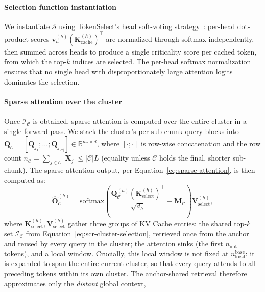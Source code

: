 \documentclass[10pt,conference]{IEEEtran}
\begin{document}
\paragraph{Selection function instantiation} 
We instantiate $\mathcal{S}$ using TokenSelect's head soft-voting 
strategy~\cite{tokenselect2025}: per-head dot-product scores
$\mathbf{v}_a^{(h)} (\mathbf{K}^{(h)}_{\text{cache}})^\top$
are normalized through softmax independently, then summed across 
heads to produce a single criticality score per cached token, from 
which the top-$k$ indices are selected. The per-head softmax 
normalization ensures that no single head with disproportionately 
large attention logits dominates the selection.

\paragraph{Sparse attention over the cluster} 
Once $\mathcal{I}_{\mathcal{C}}$ is obtained, sparse attention is 
computed over the entire cluster in a single forward pass. We stack the
cluster's per-sub-chunk query blocks into
$\mathbf{Q}_{\mathcal{C}} = [\mathbf{Q}_{j_1}; \ldots; \mathbf{Q}_{j_{|\mathcal{C}|}}] \in \mathbb{R}^{n_{\mathcal{C}} \times d}$,
where $[\cdot;\cdot]$ is row-wise concatenation and the row count
$n_{\mathcal{C}} = \sum_{j \in \mathcal{C}} |\mathbf{X}_j| \leq |\mathcal{C}| L$
(equality unless $\mathcal{C}$ holds the final, shorter sub-chunk).
The sparse attention output, per
Equation~\eqref{eq:sparse-attention}, is then computed as:
\begin{equation}
    \hat{\mathbf{O}}_{\mathcal{C}}^{(h)} = \text{softmax}\!\left(\frac{\mathbf{Q}_{\mathcal{C}}^{(h)} (\mathbf{K}^{(h)}_{\text{select}})^\top}{\sqrt{d_h}} + \mathbf{M}_{\mathcal{C}}\right) \mathbf{V}^{(h)}_{\text{select}},
    \label{eq:scr-cluster-attention}
\end{equation}
where $\mathbf{K}^{(h)}_{\text{select}}, \mathbf{V}^{(h)}_{\text{select}}$
gather three groups of KV Cache entries: the shared top-$k$ set
$\mathcal{I}_{\mathcal{C}}$ from Equation~\eqref{eq:scr-cluster-selection},
retrieved once from the anchor and reused by every query in the cluster;
the attention
sinks (the first $n_{\text{init}}$ tokens), and a local window. Crucially,
this local window is not fixed at $n_{\text{local}}^{\text{base}}$: it is
expanded to span the entire current cluster, so that every query attends
to all preceding tokens within its own cluster. The anchor-shared
retrieval therefore approximates only the \emph{distant} global context,
\end{document}
